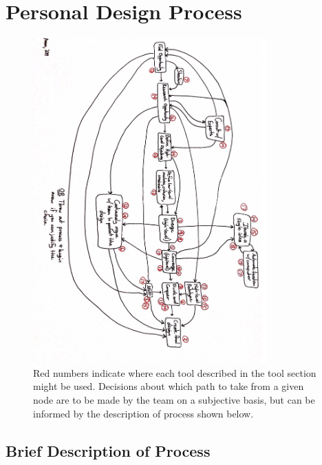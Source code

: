 \documentclass[a4paper,12pt]{article}
\begin{document}
\section{Personal Design Process}


\begin{figure}[H]
\centering
\includegraphics[width=0.8\textwidth]{img/image024.png}
\caption{Red numbers indicate where each tool described in the tool section might be used. Decisions about which path to take from a given node are to be made by the team on a subjective basis, but can be informed by the description of process shown below.}
\label{}
\end{figure}

\subsection{Brief Description of Process}
\end{document}
